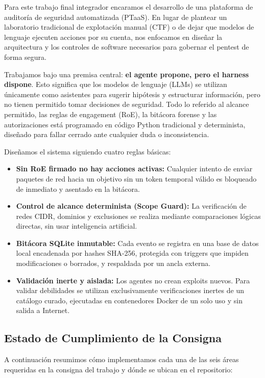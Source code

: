 \documentclass[10pt,a4paper]{article}
\begin{document}
Para este trabajo final integrador encaramos el desarrollo de una plataforma de auditoría de seguridad automatizada (PTaaS). En lugar de plantear un laboratorio tradicional de explotación manual (CTF) o de dejar que modelos de lenguaje ejecuten acciones por su cuenta, nos enfocamos en diseñar la arquitectura y los controles de software necesarios para gobernar el pentest de forma segura.

Trabajamos bajo una premisa central: \textbf{el agente propone, pero el harness dispone}. Esto significa que los modelos de lenguaje (LLMs) se utilizan únicamente como asistentes para sugerir hipótesis y estructurar información, pero no tienen permitido tomar decisiones de seguridad. Todo lo referido al alcance permitido, las reglas de engagement (RoE), la bitácora forense y las autorizaciones está programado en código Python tradicional y determinista, diseñado para fallar cerrado ante cualquier duda o inconsistencia.

Diseñamos el sistema siguiendo cuatro reglas básicas:
\begin{itemize}[noitemsep]
    \item \textbf{Sin RoE firmado no hay acciones activas:} Cualquier intento de enviar paquetes de red hacia un objetivo sin un token temporal válido es bloqueado de inmediato y asentado en la bitácora.
    \item \textbf{Control de alcance determinista (Scope Guard):} La verificación de redes CIDR, dominios y exclusiones se realiza mediante comparaciones lógicas directas, sin usar inteligencia artificial.
    \item \textbf{Bitácora SQLite inmutable:} Cada evento se registra en una base de datos local encadenada por hashes SHA-256, protegida con triggers que impiden modificaciones o borrados, y respaldada por un ancla externa.
    \item \textbf{Validación inerte y aislada:} Los agentes no crean exploits nuevos. Para validar debilidades se utilizan exclusivamente verificaciones inertes de un catálogo curado, ejecutadas en contenedores Docker de un solo uso y sin salida a Internet.
\end{itemize}

\subsection{Estado de Cumplimiento de la Consigna}

A continuación resumimos cómo implementamos cada una de las seis áreas requeridas en la consigna del trabajo y dónde se ubican en el repositorio:
\end{document}

